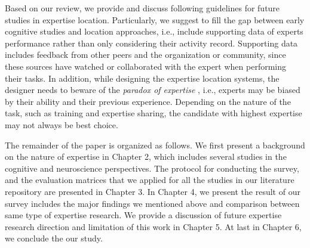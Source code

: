 Based on our review, we provide and discuss following guidelines for future studies in expertise location. Particularly, we suggest to fill the gap between early cognitive studies and location approaches, i.e., include supporting data of experts performance rather than only considering their activity record. Supporting data includes feedback from other peers and the organization or community, since these sources have watched or collaborated with the expert when performing their tasks. In addition, while designing the expertise location systems, the designer needs to beware of the \textit{paradox of expertise} \cite{dror2011paradox}, i.e., experts may be biased by their ability and their previous experience. Depending on the nature of the task, such as training and expertise sharing, the candidate with highest expertise may not always be best choice.

The remainder of the paper is organized as follows. We first present a background on the nature of expertise in Chapter 2, which includes several studies in the cognitive and neuroscience perspectives. The protocol for conducting the survey, and the evaluation matrices that we applied for all the studies in our literature repository are presented in Chapter 3. In Chapter 4, we present the result of our survey includes the major findings we mentioned above and comparison between same type of expertise research. We provide a discussion of future expertise research direction and limitation of this work in Chapter 5. At last in Chapter 6, we conclude the our study.




